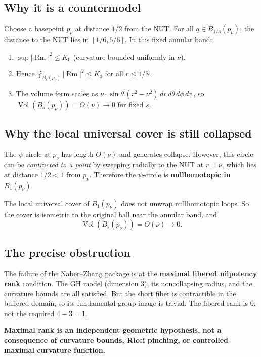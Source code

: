 \subsection{Why it is a countermodel}
Choose a basepoint $p_\nu$ at distance $1/2$ from the NUT.
For all $q\in B_{1/3}(p_\nu)$, the distance to the NUT lies in $[1/6,5/6]$.
In this fixed annular band:
\begin{enumerate}
\item $\sup|\operatorname{Rm}|^2 \le K_0$ (curvature bounded uniformly in $\nu$).
\item Hence $\fint_{B_r(p_\nu)}|\operatorname{Rm}|^2 \le K_0$ for all $r\le 1/3$.
\item The volume form scales as $\nu\cdot\sin\theta\,(r^2-\nu^2)\,dr\,d\theta\,d\phi\,d\psi$,
so $\operatorname{Vol}(B_s(p_\nu)) = O(\nu) \to 0$ for fixed $s$.
\end{enumerate}

\subsection{Why the local universal cover is still collapsed}
The $\psi$-circle at $p_\nu$ has length $O(\nu)$ and generates collapse.
However, this circle can be \emph{contracted to a point}
by sweeping radially to the NUT at $r=\nu$, which lies
at distance $1/2 < 1$ from $p_\nu$.
Therefore the $\psi$-circle is \textbf{nullhomotopic in $B_1(p_\nu)$}.

The local universal cover of $B_1(p_\nu)$ does not unwrap
nullhomotopic loops. So the cover is isometric to the original
ball near the annular band, and
\[
\operatorname{Vol}(B_s(\tilde p_\nu)) = O(\nu) \to 0.
\]

\subsection{The precise obstruction}
The failure of the Naber--Zhang package is at the
\textbf{maximal fibered nilpotency rank} condition.
The GH model (dimension 3), its noncollapsing radius, and the
curvature bounds are all satisfied. But the short fiber
is contractible in the buffered domain, so its fundamental-group
image is trivial. The fibered rank is 0, not the required $4-3=1$.

\textbf{Maximal rank is an independent geometric hypothesis, not a
consequence of curvature bounds, Ricci pinching, or
controlled maximal curvature function.}

